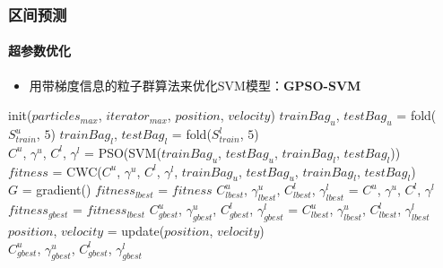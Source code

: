 \begin{frame}[allowframebreaks]
\frametitle{区间预测}
\framesubtitle{超参数优化}
\begin{itemize}
    \item 用带梯度信息的粒子群算法来优化SVM模型：\textbf{GPSO-SVM}
\end{itemize}
\begin{algorithmic}[1]
  \State init($particles_{max}$, $iterator_{max}$, $position$, $velocity$)
  \State $trainBag_u$, $testBag_u$ = fold($S^u_{train}$, $5$)
  \State $trainBag_l$, $testBag_l$ = fold($S^l_{train}$, $5$)
    \\
	\State $C^u$, $\gamma^u$, $C^l$, $\gamma^l$ = PSO(SVM($trainBag_u$, $testBag_u$, $trainBag_l$, $testBag_l$))
	\\
	\State $fitness$ = CWC($C^u$, $\gamma^u$, $C^l$, $\gamma^l$, $trainBag_u$, $testBag_u$, $trainBag_l$, $testBag_l$)
	\\
	\State $G$ = gradient()
	\framebreak
	 
		\State $fitness_{lbest}$ = $fitness$
		\State $C^u_{lbest}$, $\gamma^u_{lbest}$, $C^l_{lbest}$, $\gamma^l_{lbest}$ = $C^u$, $\gamma^u$, $C^l$, $\gamma^l$
	\EndIf
	 
		\State $fitness_{gbest}$ = $fitness_{lbest}$
		\State $C^u_{gbest}$, $\gamma^u_{gbest}$, $C^l_{gbest}$, $\gamma^l_{gbest}$ = $C^u_{lbest}$, $\gamma^u_{lbest}$, $C^l_{lbest}$, $\gamma^l_{lbest}$
	\EndIf
	\State $position$, $velocity$ = update($position$, $velocity$)
  \EndFor \\
  \Return $C^u_{gbest}$, $\gamma^u_{gbest}$, $C^l_{gbest}$, $\gamma^l_{gbest}$
\end{algorithmic}
\end{frame}

